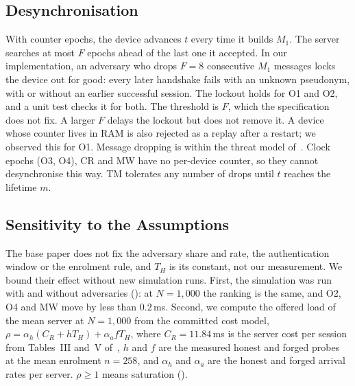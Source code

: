 \subsection{Desynchronisation}\label{sec:desync}
With counter epochs, the device advances $t$ every time it builds $M_1$. The server searches at most $F$ epochs ahead of
the last one it accepted. In our implementation, an adversary who drops $F=8$ consecutive $M_1$ messages locks the device
out for good: every later handshake fails with an unknown pseudonym, with or without an earlier successful session. The
lockout holds for O1 and O2, and a unit test checks it for both. The threshold is $F$, which the specification does not
fix. A larger $F$ delays the lockout but does not remove it. A device whose counter lives in RAM is also rejected as
a replay after a restart; we observed this for O1. Message dropping is within the threat model of~\cite{base}. Clock epochs
(O3, O4), CR and MW have no per-device counter, so they cannot desynchronise this way. TM tolerates any number of drops
until $t$ reaches the lifetime $m$.

\subsection{Sensitivity to the Assumptions}\label{sec:sens}
The base paper does not fix the adversary share and rate, the authentication window or the enrolment rule, and $T_H$ is its
constant, not our measurement. We bound their effect without new simulation runs. First, the simulation was run with and
without adversaries (): at $N=1{,}000$ the ranking is the same, and O2, O4 and MW move by less than
0.2\,ms. Second, we compute the offered load of the mean server at $N=1{,}000$ from the committed cost model,
$\rho=\alpha_h(C_R+hT_H)+\alpha_a fT_H$, where $C_R=11.84$\,ms is the server cost per session from Tables~III and~V of~\cite{base},
$h$ and $f$ are the measured honest and forged probes at the mean enrolment $n=258$, and $\alpha_h$ and $\alpha_a$ are the
honest and forged arrival rates per server. $\rho\ge1$ means saturation ().

